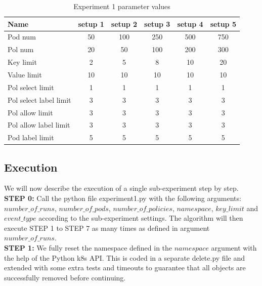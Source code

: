 \begin{table}[H]
    \centering
    \begin{tabular}{|l|c|c|c|c|c|}
        \hline
        \textbf{Name} & \textbf{setup 1} & \textbf{setup 2} & \textbf{setup 3} & \textbf{setup 4} & \textbf{setup 5}\\
        \hline
        Pod num & 50 & 100 & 250 & 500 & 750 \\
        Pol num & 20 & 50 & 100 & 200 & 300 \\
        Key limit & 2 & 5 & 8 & 10 & 20 \\
        Value limit & 10 & 10 & 10 & 10 & 10 \\
        Pol select limit & 1 & 1 & 1 & 1 & 1 \\
        Pol select label limit & 3 & 3 & 3 & 3 & 3 \\
        Pol allow limit & 3 & 3 & 3 & 3 & 3 \\
        Pol allow label limit & 3 & 3 & 3 & 3 & 3 \\
        Pod label limit & 5 & 5 & 5 & 5 & 5 \\
        \hline
    \end{tabular}
    \caption{Experiment 1 parameter values}
    \label{tab:exp1pars}
\end{table}

\subsection{Execution} \label{exp1:execution}
 We will now describe the execution of a single sub-experiment step by step.
\\[10pt]

\textbf{STEP 0:} Call the python file experiment1.py with the following arguments: $number\_of\_runs$, $number\_of\_pods$, $number\_of\_policies$, $namespace$, $key\_limit$ and $event\_type$ according to the sub-experiment settings. The algorithm will then execute STEP 1 to STEP 7 as many times as defined in argument $number\_of\_runs$.
\\[10pt]

\textbf{STEP 1:} We fully reset the namespace defined in the $namespace$ argument with the help of the Python \acrshort{k8s} API. This is coded in a separate delete.py file and extended with some extra tests and timeouts to guarantee that all objects are successfully removed before continuing.
\\[10pt]

